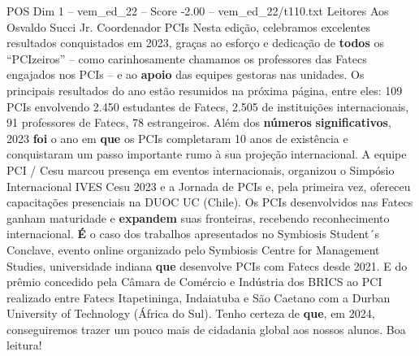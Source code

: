 \begin{textsample}{POS Dim 1 – vem\_ed\_22 – Score -2.00 – vem\_ed\_22/t110.txt}  \label{ex:f1_pos_178}
Leitores Aos Osvaldo Succi Jr.
Coordenador PCIs Nesta edição, celebramos excelentes resultados conquistados em 2023, graças ao esforço e dedicação de \textbf{todos} os “PCIzeiros” – como carinhosamente chamamos os professores das Fatecs engajados nos PCIs – e ao \textbf{apoio} das equipes gestoras nas unidades.
Os principais resultados do ano estão resumidos na próxima página, entre eles: 109 PCIs envolvendo 2.450 estudantes de Fatecs, 2.505 de instituições internacionais, 91 professores de Fatecs, 78 estrangeiros.
Além dos \textbf{números} \textbf{significativos}, 2023 \textbf{foi} o ano em \textbf{que} os PCIs completaram 10 anos de existência e conquistaram um passo importante rumo à sua projeção internacional.
A equipe PCI / Cesu marcou presença em eventos internacionais, organizou o Simpósio Internacional IVES Cesu 2023 e a Jornada de PCIs e, pela primeira vez, ofereceu capacitações presenciais na DUOC UC (Chile).
Os PCIs desenvolvidos nas Fatecs ganham maturidade e \textbf{expandem} suas fronteiras, recebendo reconhecimento internacional. \textbf{É} o caso dos trabalhos apresentados no Symbiosis Student´s Conclave, evento online organizado pelo Symbiosis Centre for Management Studies, universidade indiana \textbf{que} desenvolve PCIs com Fatecs desde 2021.
E do prêmio concedido pela Câmara de Comércio e Indústria dos BRICS ao PCI realizado entre Fatecs Itapetininga, Indaiatuba e São Caetano com a Durban University of Technology (África do Sul).
Tenho certeza de \textbf{que}, em 2024, conseguiremos trazer um pouco mais de cidadania global aos nossos alunos.
Boa leitura!

\end{textsample}
